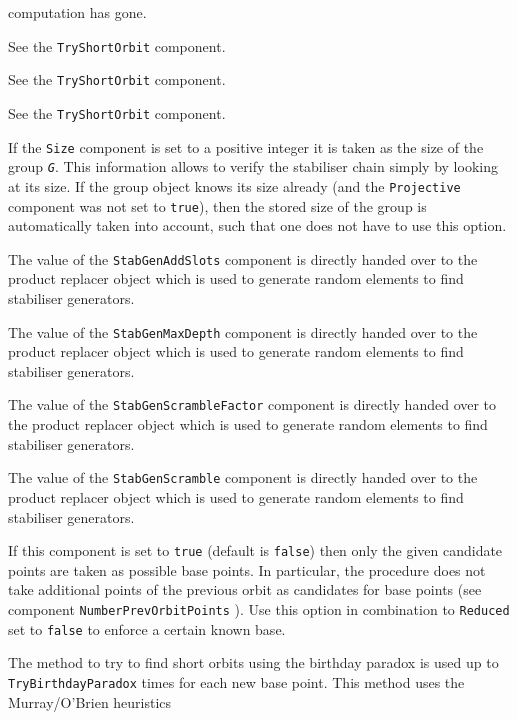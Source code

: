 \documentclass[a4paper,11pt]{report}
\begin{document}
{{\begin{description}
computation has gone. 
\item[{\texttt{ShortOrbitsInitialLimit}}]  See the \texttt{TryShortOrbit} component. 
\item[{\texttt{ShortOrbitsNrRandoms}}]  See the \texttt{TryShortOrbit} component. 
\item[{\texttt{ShortOrbitsOrbLimit}}]  See the \texttt{TryShortOrbit} component. 
\item[{\texttt{Size}}]  If the \texttt{Size} component is set to a positive integer it is taken as the size of the group \mbox{\texttt{\mdseries\slshape G}}. This information allows to verify the stabiliser chain simply by looking at
its size. If the group object knows its size already (and the \texttt{Projective} component was not set to \texttt{true}), then the stored size of the group is automatically taken into account, such
that one does not have to use this option. 
\item[{\texttt{StabGenAddSlots}}]  The value of the \texttt{StabGenAddSlots} component is directly handed over to the product replacer object which is used
to generate random elements to find stabiliser generators. 
\item[{\texttt{StabGenMaxDepth}}]  The value of the \texttt{StabGenMaxDepth} component is directly handed over to the product replacer object which is used
to generate random elements to find stabiliser generators. 
\item[{\texttt{StabGenScrambleFactor}}]  The value of the \texttt{StabGenScrambleFactor} component is directly handed over to the product replacer object which is used
to generate random elements to find stabiliser generators. 
\item[{\texttt{StabGenScramble}}]  The value of the \texttt{StabGenScramble} component is directly handed over to the product replacer object which is used
to generate random elements to find stabiliser generators. 
\item[{\texttt{StrictlyUseCandidates}}]  If this component is set to \texttt{true} (default is \texttt{false}) then only the given candidate points are taken as possible base points. In
particular, the procedure does not take additional points of the previous
orbit as candidates for base points (see component \texttt{NumberPrevOrbitPoints} ). Use this option in combination to \texttt{Reduced} set to \texttt{false} to enforce a certain known base. 
\item[{\texttt{TryBirthdayParadox}}]  The method to try to find short orbits using the birthday paradox is used up
to \texttt{TryBirthdayParadox} times for each new base point. This method uses the Murray/O'Brien heuristics

\end{description}}}
\end{document}

